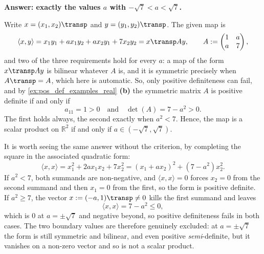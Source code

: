 \begin{exercisesolution*}
\label{sol:inner_product_parameter_a}
\textbf{Answer: exactly the values $a$ with $-\sqrt{7} < a < \sqrt{7}$.}

Write $x = (x_1, x_2)\transp$ and $y = (y_1, y_2)\transp$. The given map is
\[
    \langle x, y \rangle = x_1 y_1 + a x_1 y_2 + a x_2 y_1 + 7 x_2 y_2 = x\transp A y,
    \qquad A := \begin{pmatrix} 1 & a \\ a & 7 \end{pmatrix},
\]
and two of the three requirements hold for every $a$: a map of the form $x\transp A y$ is bilinear whatever $A$ is, and it is symmetric precisely when $A\transp = A$, which here is automatic. So, only positive definiteness can fail, and by \cref{ex:pos_def_examples_real} \textbf{(b)} the symmetric matrix $A$ is positive definite if and only if
\[
    a_{11} = 1 > 0 \quad \text{and} \quad \det(A) = 7 - a^2 > 0 .
\]
The first holds always, the second exactly when $a^2 < 7$. Hence, the map is a scalar product on $\mathbb{R}^2$ if and only if $a \in (-\sqrt{7}, \sqrt{7})$.

It is worth seeing the same answer without the criterion, by completing the square in the associated quadratic form:
\[
    \langle x, x \rangle = x_1^2 + 2a x_1 x_2 + 7 x_2^2 = (x_1 + a x_2)^2 + (7 - a^2) x_2^2 .
\]
If $a^2 < 7$, both summands are non-negative, and $\langle x, x \rangle = 0$ forces $x_2 = 0$ from the second summand and then $x_1 = 0$ from the first, so the form is positive definite. If $a^2 \ge 7$, the vector $x := (-a, 1)\transp \ne 0$ kills the first summand and leaves
\[
    \langle x, x \rangle = 7 - a^2 \le 0,
\]
which is $0$ at $a = \pm\sqrt{7}$ and negative beyond, so positive definiteness fails in both cases. The two boundary values are therefore genuinely excluded: at $a = \pm\sqrt{7}$ the form is still symmetric and bilinear, and even positive \emph{semi}-definite, but it vanishes on a non-zero vector and so is not a scalar product.
\end{exercisesolution*}


